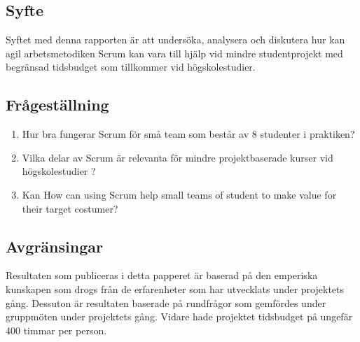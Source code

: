 \subsection{Syfte}
Syftet med denna rapporten är att undersöka, analysera och diskutera hur kan agil arbetsmetodiken Scrum kan vara till hjälp vid mindre studentprojekt med begränsad tidsbudget som tillkommer vid högskolestudier. 

\subsection{Frågeställning}
\label{subsec:Lieth_Wahid-research-questions}

\begin{enumerate}
\item Hur bra fungerar Scrum för små team som består av 8 studenter i praktiken? 
 
\item  Vilka delar av Scrum är relevanta för mindre projektbaserade kurser vid högskolestudier ? 

\item Kan How can using Scrum help small teams of student to make value for their target costumer?

\end{enumerate}

\subsection{Avgränsingar}
\label{subsec:Lieth_Wahid-delimitations}

Resultaten som publiceras i detta papperet är baserad på den emperiska kunskapen som drogs från de erfarenheter som har utvecklats under projektets gång. Dessuton är resultaten baserade på rundfrågor som gemfördes under gruppmöten under projektets gång. Vidare hade projektet tidsbudget på ungefär 400 timmar per person. 